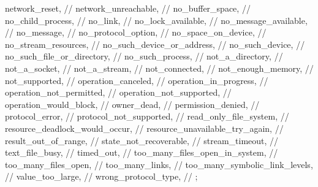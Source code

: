 \begin{codeblock}
{{    network_reset,                      // 
    network_unreachable,                // 
    no_buffer_space,                    // 
    no_child_process,                   // 
    no_link,                            // 
    no_lock_available,                  // 
    no_message_available,               // 
    no_message,                         // 
    no_protocol_option,                 // 
    no_space_on_device,                 // 
    no_stream_resources,                // 
    no_such_device_or_address,          // 
    no_such_device,                     // 
    no_such_file_or_directory,          // 
    no_such_process,                    // 
    not_a_directory,                    // 
    not_a_socket,                       // 
    not_a_stream,                       // 
    not_connected,                      // 
    not_enough_memory,                  // 
    not_supported,                      // 
    operation_canceled,                 // 
    operation_in_progress,              // 
    operation_not_permitted,            // 
    operation_not_supported,            // 
    operation_would_block,              // 
    owner_dead,                         // 
    permission_denied,                  // 
    protocol_error,                     // 
    protocol_not_supported,             // 
    read_only_file_system,              // 
    resource_deadlock_would_occur,      // 
    resource_unavailable_try_again,     // 
    result_out_of_range,                // 
    state_not_recoverable,              // 
    stream_timeout,                     // 
    text_file_busy,                     // 
    timed_out,                          // 
    too_many_files_open_in_system,      // 
    too_many_files_open,                // 
    too_many_links,                     // 
    too_many_symbolic_link_levels,      // 
    value_too_large,                    // 
    wrong_protocol_type,                // 
  };
  
}
\end{codeblock}
